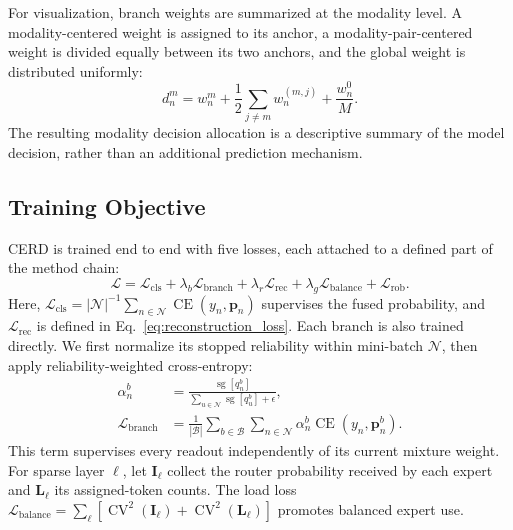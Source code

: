 \documentclass[a4paper,fleqn]{cas-dc}
\begin{document}
For visualization, branch weights are summarized at the modality level. A modality-centered weight is assigned to its anchor, a modality-pair-centered weight is divided equally between its two anchors, and the global weight is distributed uniformly:
\begin{equation}
d_n^m=w_n^m+
\frac{1}{2}\sum_{j\ne m}w_n^{(m,j)}
+\frac{w_n^0}{M}.
\label{eq:modality_weight}
\end{equation}
The resulting modality decision allocation is a descriptive summary of the model decision, rather than an additional prediction mechanism.

\subsection{Training Objective}
\label{sec:objective}

CERD is trained end to end with five losses, each attached to a defined part of the method chain:
\begin{equation}
\mathcal L=
\mathcal L_{\mathrm{cls}}
+\lambda_b\mathcal L_{\mathrm{branch}}
+\lambda_r\mathcal L_{\mathrm{rec}}
+\lambda_g\mathcal L_{\mathrm{balance}}
+\mathcal L_{\mathrm{rob}}.
\label{eq:total_objective}
\end{equation}
Here, \(\mathcal L_{\mathrm{cls}}=|\mathcal N|^{-1}\sum_{n\in\mathcal N}\operatorname{CE}(y_n,\mathbf p_n)\) supervises the fused probability, and \(\mathcal L_{\mathrm{rec}}\) is defined in Eq.~\eqref{eq:reconstruction_loss}. Each branch is also trained directly. We first normalize its stopped reliability within mini-batch \(\mathcal N\), then apply reliability-weighted cross-entropy:
\begin{equation}
\begin{aligned}
\alpha_n^b
  &=\frac{\operatorname{sg}[q_n^b]}
  {\sum_{u\in\mathcal N}\operatorname{sg}[q_u^b]+\epsilon},\\
\mathcal L_{\mathrm{branch}}
  &=\frac{1}{|\mathcal B|}\sum_{b\in\mathcal B}
    \sum_{n\in\mathcal N}\alpha_n^b
    \operatorname{CE}(y_n,\mathbf p_n^b).
\end{aligned}
\label{eq:branch_loss}
\end{equation}
This term supervises every readout independently of its current mixture weight. For sparse layer \(\ell\), let \(\mathbf I_\ell\) collect the router probability received by each expert and \(\mathbf L_\ell\) its assigned-token counts. The load loss \(\mathcal L_{\mathrm{balance}}=\sum_{\ell}[\operatorname{CV}^2(\mathbf I_\ell)+\operatorname{CV}^2(\mathbf L_\ell)]\) promotes balanced expert use.
\end{document}
